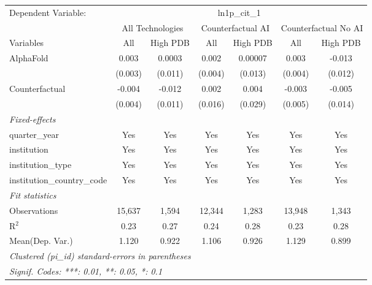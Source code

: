 \begingroup
\centering
\begin{tabular}{lcccccc}
   \tabularnewline \midrule \midrule
   Dependent Variable: & \multicolumn{6}{c}{ln1p\_cit\_1}\\
 & \multicolumn{2}{c}{All Technologies} & \multicolumn{2}{c}{Counterfactual AI} & \multicolumn{2}{c}{Counterfactual No AI} \\
\cmidrule(lr){1-1}\cmidrule(lr){2-3} \cmidrule(lr){4-5} \cmidrule(lr){6-7}
Variables & \multicolumn{1}{c}{All} & \multicolumn{1}{c}{High PDB} & \multicolumn{1}{c}{All} & \multicolumn{1}{c}{High PDB} & \multicolumn{1}{c}{All} & \multicolumn{1}{c}{High PDB} \\
\cmidrule(lr){1-1}\cmidrule(lr){2-2} \cmidrule(lr){3-3} \cmidrule(lr){4-4} \cmidrule(lr){5-5} \cmidrule(lr){6-6} \cmidrule(lr){7-7}
   AlphaFold                    & 0.003   & 0.0003  & 0.002   & 0.00007 & 0.003   & -0.013\\   
                                & (0.003) & (0.011) & (0.004) & (0.013) & (0.004) & (0.012)\\   
   Counterfactual               & -0.004  & -0.012  & 0.002   & 0.004   & -0.003  & -0.005\\   
                                & (0.004) & (0.011) & (0.016) & (0.029) & (0.005) & (0.014)\\   
   \midrule
   \emph{Fixed-effects}\\
   quarter\_year                & Yes     & Yes     & Yes     & Yes     & Yes     & Yes\\  
   institution                  & Yes     & Yes     & Yes     & Yes     & Yes     & Yes\\  
   institution\_type            & Yes     & Yes     & Yes     & Yes     & Yes     & Yes\\  
   institution\_country\_code   & Yes     & Yes     & Yes     & Yes     & Yes     & Yes\\  
   \midrule
   \emph{Fit statistics}\\
   Observations                 & 15,637  & 1,594   & 12,344  & 1,283   & 13,948  & 1,343\\  
   R$^2$                        & 0.23    & 0.27    & 0.24    & 0.28    & 0.23    & 0.28\\  
Mean(Dep. Var.) & 1.120 & 0.922 & 1.106 & 0.926 & 1.129 & 0.899 \\
   \midrule \midrule
   \multicolumn{7}{l}{\emph{Clustered (pi\_id) standard-errors in parentheses}}\\
   \multicolumn{7}{l}{\emph{Signif. Codes: ***: 0.01, **: 0.05, *: 0.1}}\\
\end{tabular}
\par\endgroup
